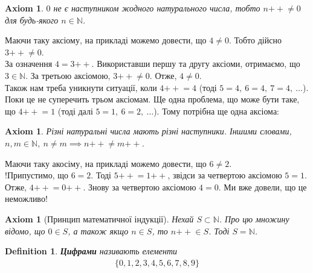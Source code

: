 \documentclass[a4paper, 14pt]{extarticle}
\theoremstyle{theoremdd}
\theoremstyle{theoremdd}
\newtheorem{definition}[theorem]{Definition}
\theoremstyle{theoremdd}
\newtheorem{axiom}[theorem]{Axiom}
\theoremstyle{theoremdd}
\theoremstyle{theoremdd}
\theoremstyle{theoremdd}
\theoremstyle{theoremdd}
\theoremstyle{theoremdd}
\theoremstyle{theoremdd}
\theoremstyle{theoremdd}
\theoremstyle{theoremdd}
\theoremstyle{theoremdd}
\theoremstyle{theoremdd}
\theoremstyle{theoremdd}
\theoremstyle{theoremdd}
\theoremstyle{theoremdd}
\newcommand{\plusplus}{\!\!\mathrel{++}}
\begin{document}
\begin{axiom}
$0$ не є наступником жодного натурального числа, тобто $n \plusplus \neq 0$ для будь-якого $n \in \mathbb{N}$.
\end{axiom}
Маючи таку аксіому, на прикладі можемо довести, що $4 \neq 0$. Тобто дійсно $3\plusplus \neq 0$.\\
За означення $4 = 3\plusplus$. Використавши першу та другу аксіоми, отримаємо, що $3 \in \mathbb{N}$. За третьою аксіомою, $3\plusplus \neq 0$. Отже, $4 \neq 0$.
\bigskip \\
Також нам треба уникнути ситуації, коли $4 \plusplus = 4$ (тоді $5 = 4,\ 6 = 4,\ 7 = 4,\ \dots$). Поки це не суперечить трьом аксіомам. Ще одна проблема, що може бути таке, що $4\plusplus = 1$ (тоді далі $5 = 1,\ 6 = 2,\ \dots$). Тому потрібна ще одна аксіома:

\begin{axiom}
Різні натуральні числа мають різні наступники. Іншими словами, $n,m \in \mathbb{N},\ n \neq m \implies n\plusplus \neq m \plusplus$.
\end{axiom}

Маючи таку акосіму, на прикладі можемо довести, що $6 \neq 2$.\\
!Припустимо, що $6 = 2$. Тоді $5\plusplus = 1\plusplus$, звідси за четвертою аксіомою $5 = 1$. Отже, $4 \plusplus = 0\plusplus$. Знову за четвертою аксіомою $4 = 0$. Ми вже довели, що це неможливо!

\begin{axiom}[Принцип математичної індукції]
Нехай $S \subset \mathbb{N}$. Про цю множину відомо, що $0 \in S$, а також якщо $n \in S$, то $n\plusplus \in S$. Тоді $S = \mathbb{N}$.  
\end{axiom}

\begin{definition}
\textbf{Цифрами} називають елементи
\begin{align*}
\{0,1,2,3,4,5,6,7,8,9\}
\end{align*}
\end{definition}
\end{document}
